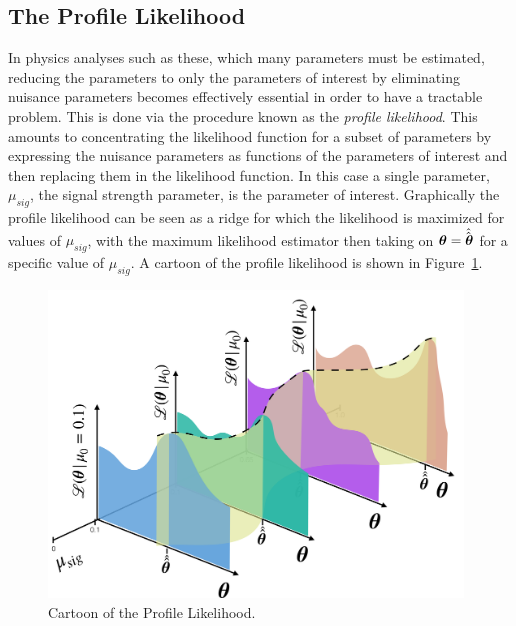 \subsection{The Profile Likelihood}
\label{sec:stats:ProfileLiklihood}
In physics analyses such as these, which many parameters must be estimated, reducing the parameters to only the parameters of interest by eliminating nuisance parameters becomes effectively essential in order to have a tractable problem.
This is done via the procedure known as the \emph{profile likelihood}.
This amounts to concentrating the likelihood function for a subset of parameters by expressing the nuisance parameters as functions of the parameters of interest and then replacing them in the likelihood function.
In this case a single parameter, $\mu_{sig}$, the signal strength parameter, is the parameter of interest.
Graphically the profile likelihood can be seen as a ridge for which the likelihood is maximized for values of $\mu_{sig}$, with the maximum likelihood estimator then taking on $\boldsymbol\theta=\hat{\vphantom{\rule{1pt}{0.1ex}}\hat{\boldsymbol{\theta}}}$ for a specific value of $\mu_{sig}$. A cartoon of the profile likelihood is shown in Figure~\ref{fig:ProfileLikelihood}.
\begin{figure}[tbp]
  \begin{center}
    \includegraphics[width=0.98\textwidth]{figs/rpvthreel/LikelihoodProfileCartoon.png}
  \end{center}
  \caption[Cartoon of the Profile Likelihood.]
          {Cartoon of the Profile Likelihood.}
          \label{fig:ProfileLikelihood}
\end{figure}

